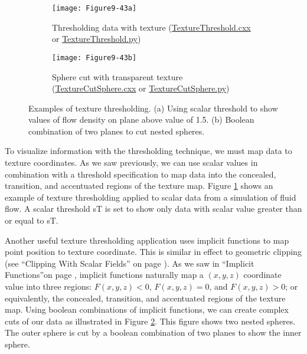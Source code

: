 \begin{figure}[htb]
	\begin{subfigure}[h]{0.48\linewidth}
		\texttt{[image: Figure9-43a]}
		\captionsetup{justification=centering}
		\caption{Thresholding data with texture (\href{https://lorensen.github.io/VTKExamples/site/Cxx/Texture/TextureThreshold/}{TextureThreshold.cxx} or \href{https://lorensen.github.io/VTKExamples/site/Python/Texture/TextureThreshold/}{TextureThreshold.py})}
		\label{fig:Figure9-43a}
	\end{subfigure}
	\hfill
	\begin{subfigure}[h]{0.48\linewidth}
		\texttt{[image: Figure9-43b]}
		\captionsetup{justification=centering}
		\caption{Sphere cut with transparent texture (\href{https://lorensen.github.io/VTKExamples/site/Cxx/Texture/TextureCutSphere/}{TextureCutSphere.cxx} or \href{https://lorensen.github.io/VTKExamples/site/Python/Texture/TextureCutSphere/}{TextureCutSphere.py})}
		\label{fig:Figure9-43b}
	\end{subfigure}
	\caption{Examples of texture thresholding. (a) Using scalar threshold to show values of flow density on plane above value of 1.5. (b) Boolean combination of two planes to cut nested spheres.}\label{fig:Figure9-43}
\end{figure}

To visualize information with the thresholding technique, we must map data to texture coordinates. As we saw previously, we can use scalar values in combination with a threshold specification to map data into the concealed, transition, and accentuated regions of the texture map. Figure \ref{fig:Figure9-43a} shows an example of texture thresholding applied to scalar data from a simulation of fluid flow. A scalar threshold sT is set to show only data with scalar value greater than or equal to sT.

Another useful texture thresholding application uses implicit functions to map point position to texture coordinate. This is similar in effect to geometric clipping (see ``Clipping With Scalar Fields'' on page \pageref{subsec:clipping_with_scalar_fields}). As we saw in ``Implicit Functions''on page \pageref{subsec:implicit_functions}, implicit functions naturally map a $(x, y, z)$ coordinate value into three regions: $F(x, y, z) < 0$, $F(x, y, z) = 0$, and $F(x, y, z) > 0$; or equivalently, the concealed, transition, and accentuated regions of the texture map. Using boolean combinations of implicit functions, we can create complex cuts of our data as illustrated in Figure \ref{fig:Figure9-43b}. This figure shows two nested spheres. The outer sphere is cut by a boolean combination of two planes to show the inner sphere.

